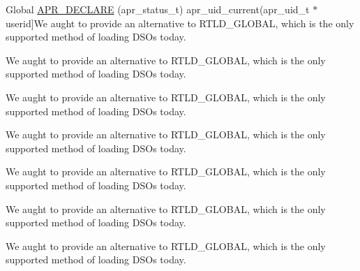 \begin{DoxyRefList}
\hypertarget{bug__bug000010}{}%
Global \hyperlink{group__apr__user_ga57b4c6adc3e9d22eeaeb32c8faafcc83}{A\+P\+R\+\_\+\+D\+E\+C\+L\+A\+RE} (apr\+\_\+status\+\_\+t) apr\+\_\+uid\+\_\+current(apr\+\_\+uid\+\_\+t $\ast$userid]We aught to provide an alternative to R\+T\+L\+D\+\_\+\+G\+L\+O\+B\+AL, which is the only supported method of loading D\+S\+Os today.  
\item[\label{bug__bug000010}%
\hypertarget{bug__bug000010}{}%
Global \hyperlink{group__apr__user_ga57b4c6adc3e9d22eeaeb32c8faafcc83}{A\+P\+R\+\_\+\+D\+E\+C\+L\+A\+RE} (apr\+\_\+status\+\_\+t) apr\+\_\+uid\+\_\+current(apr\+\_\+uid\+\_\+t $\ast$userid]We aught to provide an alternative to R\+T\+L\+D\+\_\+\+G\+L\+O\+B\+AL, which is the only supported method of loading D\+S\+Os today.  
\item[\label{bug__bug000010}%
\hypertarget{bug__bug000010}{}%
Global \hyperlink{group__apr__user_ga57b4c6adc3e9d22eeaeb32c8faafcc83}{A\+P\+R\+\_\+\+D\+E\+C\+L\+A\+RE} (apr\+\_\+status\+\_\+t) apr\+\_\+uid\+\_\+current(apr\+\_\+uid\+\_\+t $\ast$userid]We aught to provide an alternative to R\+T\+L\+D\+\_\+\+G\+L\+O\+B\+AL, which is the only supported method of loading D\+S\+Os today.  
\item[\label{bug__bug000010}%
\hypertarget{bug__bug000010}{}%
Global \hyperlink{group__apr__user_ga57b4c6adc3e9d22eeaeb32c8faafcc83}{A\+P\+R\+\_\+\+D\+E\+C\+L\+A\+RE} (apr\+\_\+status\+\_\+t) apr\+\_\+uid\+\_\+current(apr\+\_\+uid\+\_\+t $\ast$userid]We aught to provide an alternative to R\+T\+L\+D\+\_\+\+G\+L\+O\+B\+AL, which is the only supported method of loading D\+S\+Os today.  
\item[\label{bug__bug000010}%
\hypertarget{bug__bug000010}{}%
Global \hyperlink{group__apr__user_ga57b4c6adc3e9d22eeaeb32c8faafcc83}{A\+P\+R\+\_\+\+D\+E\+C\+L\+A\+RE} (apr\+\_\+status\+\_\+t) apr\+\_\+uid\+\_\+current(apr\+\_\+uid\+\_\+t $\ast$userid]We aught to provide an alternative to R\+T\+L\+D\+\_\+\+G\+L\+O\+B\+AL, which is the only supported method of loading D\+S\+Os today.  
\item[\label{bug__bug000010}%
\hypertarget{bug__bug000010}{}%
Global \hyperlink{group__apr__user_ga57b4c6adc3e9d22eeaeb32c8faafcc83}{A\+P\+R\+\_\+\+D\+E\+C\+L\+A\+RE} (apr\+\_\+status\+\_\+t) apr\+\_\+uid\+\_\+current(apr\+\_\+uid\+\_\+t $\ast$userid]We aught to provide an alternative to R\+T\+L\+D\+\_\+\+G\+L\+O\+B\+AL, which is the only supported method of loading D\+S\+Os today.  
\item[\label{bug__bug000010}%
\hypertarget{bug__bug000010}{}%
Global \hyperlink{group__apr__user_ga57b4c6adc3e9d22eeaeb32c8faafcc83}{A\+P\+R\+\_\+\+D\+E\+C\+L\+A\+RE} (apr\+\_\+status\+\_\+t) apr\+\_\+uid\+\_\+current(apr\+\_\+uid\+\_\+t $\ast$userid]We aught to provide an alternative to R\+T\+L\+D\+\_\+\+G\+L\+O\+B\+AL, which is the only supported method of loading D\+S\+Os today.  

\end{DoxyRefList}

